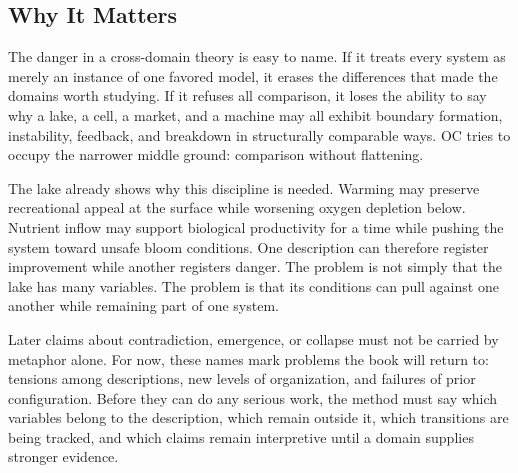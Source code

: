 \documentclass[11pt,a4paper,openany]{book}
\begin{document}
\subsection{Why It Matters}
The danger in a cross-domain theory is easy to name. If it treats every system as merely an instance of one favored model, it erases the differences that made the domains worth studying. If it refuses all comparison, it loses the ability to say why a lake, a cell, a market, and a machine may all exhibit boundary formation, instability, feedback, and breakdown in structurally comparable ways. OC tries to occupy the narrower middle ground: comparison without flattening. \cite{wilson_renormalization,landau_stat_physics}\par
The lake already shows why this discipline is needed. Warming may preserve recreational appeal at the surface while worsening oxygen depletion below. Nutrient inflow may support biological productivity for a time while pushing the system toward unsafe bloom conditions. One description can therefore register improvement while another registers danger. The problem is not simply that the lake has many variables. The problem is that its conditions can pull against one another while remaining part of one system.\par
Later claims about contradiction, emergence, or collapse must not be carried by metaphor alone. For now, these names mark problems the book will return to: tensions among descriptions, new levels of organization, and failures of prior configuration. Before they can do any serious work, the method must say which variables belong to the description, which remain outside it, which transitions are being tracked, and which claims remain interpretive until a domain supplies stronger evidence.\par
\end{document}
